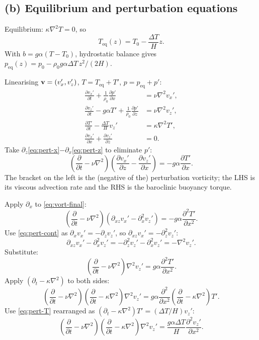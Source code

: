 \documentclass[11pt]{article}
\newcommand{\pd}[2]{\frac{\partial #1}{\partial #2}}
\newcommand{\pdd}[2]{\frac{\partial^{2} #1}{\partial #2^{2}}}
\newcommand{\Lap}{\nabla^{2}}
\begin{document}
\subsection*{(b) Equilibrium and perturbation equations}

Equilibrium: $\kappa\Lap T=0$, so
\begin{equation}
\boxed{\;T_{\text{eq}}(z) = T_0 - \frac{\Delta T}{H}z.\;}
\end{equation}
With $b = g\alpha(T-T_0)$, hydrostatic balance gives $p_{\text{eq}}(z) = p_0 - \rho_0 g\alpha\Delta T\,z^2/(2H)$.

Linearising $\vb v=(v_x',v_z')$, $T=T_{\text{eq}}+T'$, $p=p_{\text{eq}}+p'$:
\begin{align}
\pd{v_x'}{t} + \frac{1}{\rho_0}\pd{p'}{x} &= \nu\Lap v_x',\label{eq:pert-x}\\
\pd{v_z'}{t} - g\alpha T' + \frac{1}{\rho_0}\pd{p'}{z} &= \nu\Lap v_z',\label{eq:pert-z}\\
\pd{T'}{t} - \frac{\Delta T}{H}v_z' &= \kappa\Lap T',\label{eq:pert-T}\\
\pd{v_x'}{x} + \pd{v_z'}{z} &= 0.\label{eq:pert-cont}
\end{align}
Take $\partial_z$\eqref{eq:pert-x}$-\partial_x$\eqref{eq:pert-z} to eliminate $p'$:
\begin{equation}
\boxed{\;\!\!\left(\pd{}{t} - \nu\Lap\right)\!\!\left(\pd{v_x'}{z} - \pd{v_z'}{x}\right) = -g\alpha\pd{T'}{x}.\;}
\label{eq:vort-final}
\end{equation}
The bracket on the left is the (negative of the) perturbation vorticity; the LHS is its viscous advection rate and the RHS is the baroclinic buoyancy torque.

Apply $\partial_x$ to \eqref{eq:vort-final}:
\[ \!\!\left(\pd{}{t}-\nu\Lap\right)\!\!\left(\partial_{xz} v_x' - \partial_{x}^2 v_z'\right) = -g\alpha\pdd{T'}{x}. \]
Use \eqref{eq:pert-cont} as $\partial_x v_x' = -\partial_z v_z'$, so $\partial_{xz}v_x' = -\partial_z^2 v_z'$:
\[ \partial_{xz}v_x' - \partial_x^2 v_z' = -\partial_z^2 v_z' - \partial_x^2 v_z' = -\Lap v_z'. \]
Substitute:
\[ \!\!\left(\pd{}{t}-\nu\Lap\right)\Lap v_z' = g\alpha\pdd{T'}{x}. \]
Apply $(\partial_t-\kappa\Lap)$ to both sides:
\[ \!\!\left(\pd{}{t}-\nu\Lap\right)\!\!\left(\pd{}{t}-\kappa\Lap\right)\Lap v_z' = g\alpha\pdd{}{x}\!\!\left(\pd{}{t}-\kappa\Lap\right)T'. \]
Use \eqref{eq:pert-T} rearranged as $(\partial_t-\kappa\Lap)T' = (\Delta T/H)v_z'$:
\begin{equation}
\boxed{\;\!\!\left(\pd{}{t}-\nu\Lap\right)\!\!\left(\pd{}{t}-\kappa\Lap\right)\Lap v_z' = \frac{g\alpha\Delta T}{H}\pdd{v_z'}{x}.\;}
\label{eq:RB-master}
\end{equation}
\end{document}
